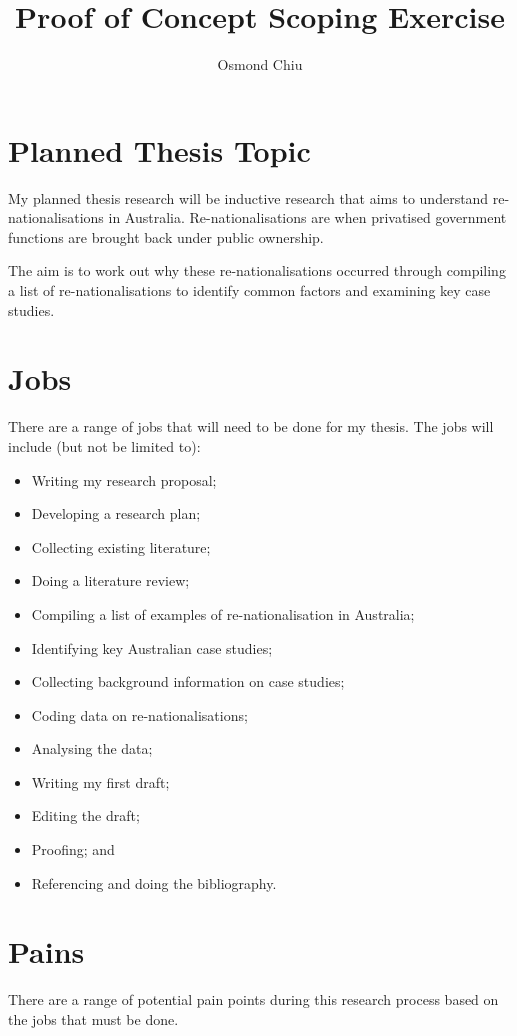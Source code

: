 \documentclass{article}
\title{Proof of Concept Scoping Exercise}
\author{Osmond Chiu}
\begin{document}
\maketitle
\section*{Planned Thesis Topic}

My planned thesis research will be inductive research that aims to understand re-nationalisations in Australia. Re-nationalisations are when privatised government functions are brought back under public ownership.\par
The aim is to work out why these re-nationalisations occurred through compiling a list of re-nationalisations to identify common factors and examining key case studies.

\section*{Jobs}

There are a range of jobs that will need to be done for my thesis. The jobs will include (but not be limited to):
\begin{itemize}
\item Writing my research proposal;
\item Developing a research plan;
\item Collecting existing literature;
\item Doing a literature review;
\item Compiling a list of examples of re-nationalisation in Australia;
\item Identifying key Australian case studies;
\item Collecting background information on case studies;
\item Coding data on re-nationalisations;
\item Analysing the data;
\item Writing my first draft;
\item Editing the draft;
\item Proofing; and
\item Referencing and doing the bibliography.
\end{itemize}

\section*{Pains}

There are a range of potential pain points during this research process based on the jobs that must be done. \par
\end{document}
